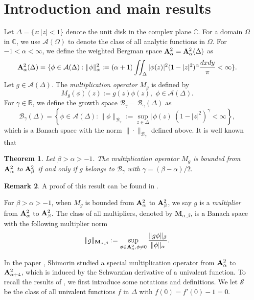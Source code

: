 \documentclass[10pt]{amsart}
\newtheorem{theorem}{Theorem}[section]
\theoremstyle{definition}    %
\newtheorem{remark}[theorem]{Remark}
\numberwithin{equation}{section}
\begin{document}
\section{{\bf {Introduction and main results}}}
Let $\Delta=\{z:|z|<1\}$ denote the unit disk in the
complex plane $\mathbb{C}$. For a domain $\Omega$ in $\mathbb{C}$, we use $\mathcal{A}(\Omega)$ to denote the class of all analytic functions in $\Omega$. For $-1<\alpha<\infty$, we define the weighted Bergman space ${\bf A}_{\alpha}^2={\bf A}_{\alpha}^2(\Delta)$ as
$${\bf A}_{\alpha}^2(\Delta)=\{\phi \in \mathcal{A}(\Delta) : \|\phi\|_{\alpha}^2:=(\alpha+1)\iint_{\Delta}|\phi (z)|^2(1-|z|^2)^{\alpha}\frac{dxdy}{\pi}<\infty\}.$$
Let $g \in \mathcal{A}(\Delta)$. The {\em multiplication operator} $M_g$ is defined by
$$M_g(\phi)(z):=g(z)\phi(z), \,\,\phi\in \mathcal{A}(\Delta).$$
For $\gamma\in \mathbb{R}$, we define the growth space $\mathcal{B}_{\gamma}=\mathcal{B}_{\gamma}(\Delta)$ as
$$
\mathcal{B}_{\gamma}(\Delta)=\left\{ \phi \in \mathcal{A}(\Delta) : 
\|\phi\|_{\mathcal{B}_{\gamma}}:=\sup_{z\in \Delta}|\phi(z)|(1-|z|^2)^{\gamma}<\infty \right\},
$$
which is a Banach space with the norm $\|\cdot\|_{\mathcal{B}_{\gamma}}$ defined above.
It is well known that 
\begin{theorem}\label{th-1}Let $\beta>\alpha>-1$. 
The multiplication operator $M_g$ is bounded from ${\bf A}_{\alpha}^2$ to ${\bf A}_{\beta}^2$ if and only if $g$ belongs to $\mathcal{B}_{\gamma}$ with $\gamma=(\beta-\alpha)/2.$
\end{theorem}
\begin{remark}
A proof of this result can be found in \cite{zhao}. 
\end{remark}
For $\beta>\alpha>-1$, when $M_g$ is bounded from ${\bf A}_{\alpha}^2$ to ${\bf A}_{\beta}^2$, we say $g$ is a {\em multiplier} from ${\bf A}_{\alpha}^2$ to ${\bf A}_{\beta}^2$. The class of all multipliers, denoted by $\mathbf{M}_{\alpha, \beta}$, is a Banach space with the following multiplier norm
$$
\|g\|_{{\bf {M}}_{\alpha, \beta}}:=\sup_{\phi \in {\bf A}^{2}_{\alpha}, \phi \neq 0}\frac{\|g \phi\|_{\beta}}{\|\phi\|_{\alpha}}.
$$ 

In the paper \cite{SS}, Shimorin studied a special multiplication operator from ${\bf A}_{\alpha}^2$ to ${\bf A}_{\alpha+4}^2$, which is induced by the Schwarzian derivative of a univalent function.  To recall the results of \cite{SS}, we first introduce some notations and definitions. We let $\mathcal{S}$ be the class of all univalent functions $f$ in $\Delta$ with $f(0)=f'(0)-1=0$.  
\end{document}
